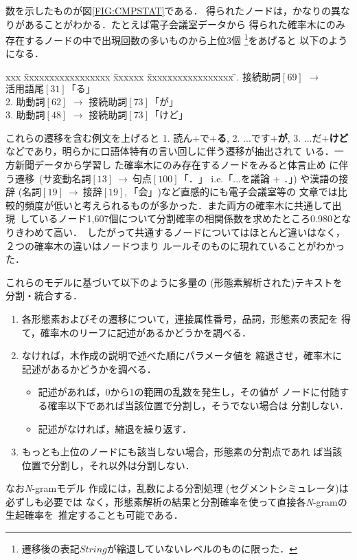 数を示したものが図\ref{FIG:CMPSTAT}である．
得られたノードは，かなりの異なりがあることがわかる．\mbox{たとえば電子会議室}データから
得られた確率木にのみ存在するノードの中で出現回数の多いものから上位3個
\footnote{遷移後の表記$String$が縮退していないレベルのものに限った．}をあげると
以下のようになる．
\begin{tabbing}
  xxx \= xxxxxxxxxxxxxxxxx \= xxxxxx \= xxxxxxxxxxxxxxxxx \= . \> $接続助詞[69]$ \> $\rightarrow$ \> $活用語尾[31]「る」$   \\
  2. \> $助動詞[62]$   \> $\rightarrow$ \> $接続助詞[73]「が」$   \\
  3. \> $助動詞[48]$   \> $\rightarrow$ \> $接続助詞[73]「けど」$ \\
\end{tabbing}
\par
  これらの遷移を含む例文を上げると 1. 読ん+で+{\bf る}, 2. ...です+{\bf が}, 
3. ...だ+{\bf けど}などであり，明らかに口語体特有の言い回しに伴う遷移が抽出されて
いる．一方新聞データから学習し\break
た確率木にのみ存在するノードをみると体言止め
\mbox{に伴う遷移 ($サ変動名詞[13] \:\rightarrow \: 句点[100]「．」$} i.e.「...を議論 + ．」)
や漢語の接辞 ($名詞[19] \:\rightarrow\: 接辞[19],「会」$)\mbox{など直感的にも電子会議室}等の
文章では比較的頻度が低いと考えられるものが多かった．\mbox{また両方の確率木に共通して出}\mbox{現
しているノード1,607個}について分割確率の\mbox{相関係数を求めたところ0.980となりきわめて高}\mbox{い．
したがって共通するノードに}ついてはほとんど違いはなく，２つの確率木の違いはノードつまり
ルールそのものに現れていることがわかった．
\par
これらのモデルに基づいて以下のように多量の
(形態素解析された)テキストを分割・統合する．
\begin{enumerate}
  \item 各形態素およびその遷移について，連接属性番号，品詞，形態素の表記を
得て，確率木のリーフに記述があるかどうかを調べる．
  \item なければ，木作成の説明で述べた順にパラメータ値を
縮退させ，確率木に記述があるかどうかを調べる．
  \begin{itemize}
     \item 記述があれば，0から1の範囲の乱数を発生し，その値が
ノードに付随する確率以下であれば当該位置で分割し，そうでない場合は
分割しない．
     \item 記述がなければ，縮退を繰り返す．
  \end{itemize}
  \item もっとも上位のノードにも該当しない場合，形態素の分割点であれ
ば当該位置で分割し，それ以外は分割しない．
\end{enumerate}
なお{\it N}-gramモデル
作成には，乱数による分割処理 (セグメントシミュレータ)は必ずしも必要では
なく，形態素解析の結果と分割確率を使って\mbox{直接各{\it N}-gramの生起確率を
推定することも可}能である．
